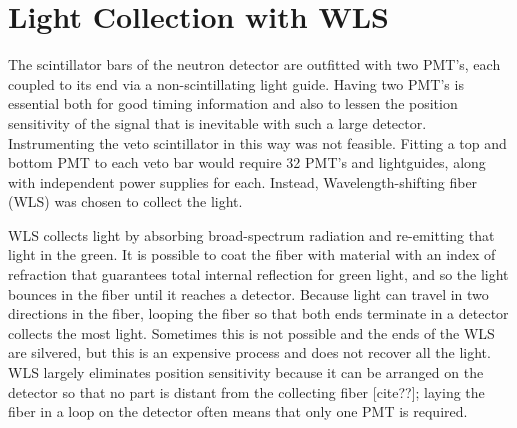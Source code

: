 \section{Light Collection with WLS}

The scintillator bars of the neutron detector are outfitted with two PMT's, each coupled to its end via a non-scintillating light guide.  Having two PMT's is essential both for good timing information and also to lessen the position sensitivity of the signal that is inevitable with such a large detector.  Instrumenting the veto scintillator in this way was not feasible.  Fitting a top and bottom PMT to each veto bar would require 32 PMT's and lightguides, along with independent power supplies for each.  Instead, Wavelength-shifting fiber (WLS) was chosen to collect the light.

WLS collects light by absorbing broad-spectrum radiation and re-emitting that light in the green.  It is possible to coat the fiber with material with an index of refraction that guarantees total internal reflection for green light, and so the light bounces in the fiber until it reaches a detector.  Because light can travel in two directions in the fiber, looping the fiber so that both ends terminate in a detector collects the most light.  Sometimes this is not possible and the ends of the WLS are silvered, but this is an expensive process and does not recover all the light.  WLS largely eliminates position sensitivity because it can be arranged on the detector so that no part is distant from the collecting fiber [cite??]; laying the fiber in a loop on the detector often means that only one PMT is required.

